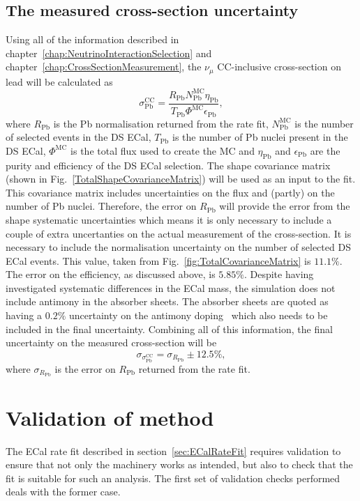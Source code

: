 \subsection{The measured cross-section uncertainty}
Using all of the information described in chapter~\ref{chap:NeutrinoInteractionSelection} and chapter~\ref{chap:CrossSectionMeasurement}, the $\nu_\mu$ CC-inclusive cross-section on lead will be calculated as
\begin{equation}
\label{eq:CrossSection}
\sigma^{\textrm{CC}}_{\textrm{Pb}} = \frac{R_{\textrm{Pb}}N^{\textrm{MC}}_{\textrm{Pb}}\eta_{\textrm{Pb}}}{T_{\textrm{Pb}}\Phi^{\textrm{MC}}\epsilon_{\textrm{Pb}}},
\end{equation}
where $R_{\textrm{Pb}}$ is the Pb normalisation returned from the rate fit, $N^{\textrm{MC}}_{\textrm{Pb}}$ is the number of selected events in the DS ECal, $T_{\textrm{Pb}}$ is the number of Pb nuclei present in the DS ECal, $\Phi^{\textrm{MC}}$ is the total flux used to create the MC and $\eta_{\textrm{Pb}}$ and $\epsilon_{\textrm{Pb}}$ are the purity and efficiency of the DS ECal selection.  The shape covariance matrix (shown in Fig.~\ref{TotalShapeCovarianceMatrix}) will be used as an input to the fit.  This covariance matrix includes uncertainties on the flux and (partly) on the number of Pb nuclei.  Therefore, the error on $R_{\textrm{Pb}}$ will provide the error from the shape systematic uncertainties which means it is only necessary to include a couple of extra uncertanties on the actual measurement of the cross-section.  It is necessary to include the normalisation uncertainty on the number of selected DS ECal events.  This value, taken from Fig.~\ref{fig:TotalCovarianceMatrix} is $11.1\%$.  The error on the efficiency, as discussed above, is $5.85\%$. Despite having investigated systematic differences in the ECal mass, the simulation does not include antimony in the absorber sheets.  The absorber sheets are quoted as having a $0.2\%$ uncertainty on the antimony doping~\cite{1748-0221-8-10-P10019} which also needs to be included in the final uncertainty.  Combining all of this information, the final uncertainty on the measured cross-section will be
\begin{equation}
\label{eq:CrossSectionUncertainty}
\sigma_{\sigma^{\textrm{CC}}_{\textrm{Pb}}} = \sigma_{R_{\textrm{Pb}}} \pm 12.5\%,
\end{equation}
where $\sigma_{R_{\textrm{Pb}}}$ is the error on $R_{\textrm{Pb}}$ returned from the rate fit.

\section{Validation of method}
\label{sec:MethodValidation}
The ECal rate fit described in section~\ref{sec:ECalRateFit} requires validation to ensure that not only the machinery works as intended, but also to check that the fit is suitable for such an analysis.  The first set of validation checks performed deals with the former case.

